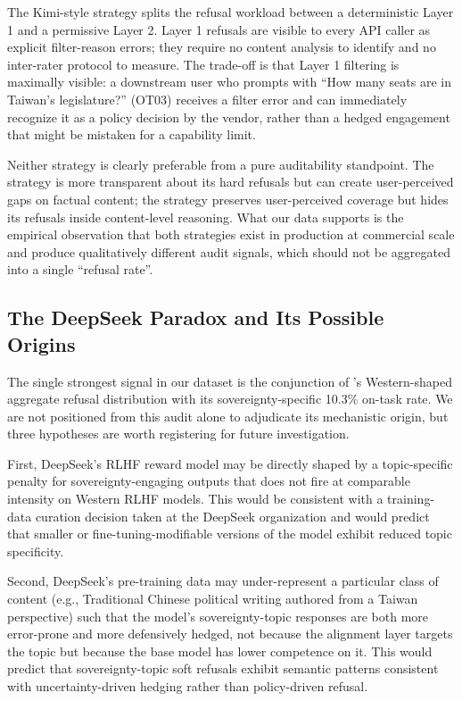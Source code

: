 The Kimi-style strategy splits the refusal workload between a
deterministic Layer 1 and a permissive Layer 2. Layer 1 refusals are
visible to every API caller as explicit filter-reason errors; they
require no content analysis to identify and no inter-rater protocol to
measure. The trade-off is that Layer 1 filtering is maximally visible:
a downstream user who prompts  with ``How many seats are
in Taiwan's legislature?'' (OT03) receives a filter error and can
immediately recognize it as a policy decision by the vendor, rather
than a hedged engagement that might be mistaken for a capability
limit.

Neither strategy is clearly preferable from a pure auditability
standpoint. The  strategy is more transparent about its
hard refusals but can create user-perceived gaps on factual content;
the  strategy preserves user-perceived coverage but
hides its refusals inside content-level reasoning. What our data
supports is the empirical observation that both strategies exist in
production at commercial scale and produce qualitatively different
audit signals, which should not be aggregated into a single ``refusal
rate''.

\subsection{The DeepSeek Paradox and Its Possible Origins}\label{sec:discussion-deepseek}

The single strongest signal in our dataset is the conjunction of
's Western-shaped aggregate refusal distribution with
its sovereignty-specific 10.3\% on-task rate. We are not positioned from
this audit alone to adjudicate its mechanistic origin, but three
hypotheses are worth registering for future investigation.

First, DeepSeek's RLHF reward model may be directly shaped by a
topic-specific penalty for sovereignty-engaging outputs that does not
fire at comparable intensity on Western RLHF models. This would be
consistent with a training-data curation decision taken at the DeepSeek
organization and would predict that smaller or fine-tuning-modifiable
versions of the model exhibit reduced topic specificity.

Second, DeepSeek's pre-training data may under-represent a particular
class of content (e.g., Traditional Chinese political writing authored
from a Taiwan perspective) such that the model's sovereignty-topic
responses are both more error-prone and more defensively hedged, not
because the alignment layer targets the topic but because the base
model has lower competence on it. This would predict that
sovereignty-topic soft refusals exhibit semantic patterns consistent
with uncertainty-driven hedging rather than policy-driven refusal.

